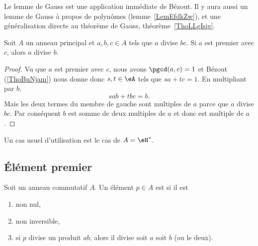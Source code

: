 Le lemme de Gauss est une application immédiate de Bézout. Il y aura aussi un lemme de Gauss à propos de polynômes (lemme~\ref{LemEfdkZw}), et une généralisation directe au théorème de Gauss, théorème~\ref{ThoLLgIsig}.
\begin{lemma}    \label{LemSdnZNX}
    Soit \( A\) un anneau principal et \( a,b,c\in A\) tels que \( a\) divise \( bc\). Si \( a\) est premier avec \( c\), alors \( a\) divise \( b\).
\end{lemma}

\begin{proof}
    Vu que \( a\) est premier avec \( c\), nous avons \( \pgcd(a,c)=1\) et Bézout (\ref{ThoBuNjam}) nous donne donc \( s,t\in \eA\) tels que \( sa+tc=1\). En multipliant par \( b\),
    \begin{equation}
        sab+tbc=b.
    \end{equation}
    Mais les deux termes du membre de gauche sont multiples de \( a\) parce que \( a\) divise \( bc\). Par conséquent \( b\) est somme de deux multiples de \( a\) et donc est multiple de \( a\).
\end{proof}
Un cas usuel d'utilisation est le cas de \( A=\eN^*\).

\subsection{Élément premier}

\begin{definition}       \label{DEFooZCRQooWXRalw}
    Soit un anneau commutatif \( A\). Un élément \( p\in A\) est  si il est
    \begin{enumerate}
        \item
            non nul,
        \item
            non inversible,
        \item       \label{ITEMooPMTTooCVHPIm}
            si \( p\) divise un produit \( ab\), alors il divise soit \( a\) soit \( b\) (ou le deux).
    \end{enumerate}
\end{definition}

